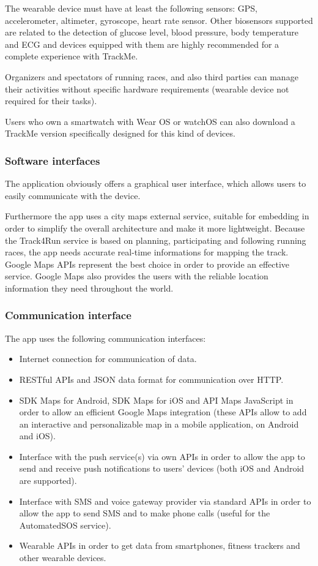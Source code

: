 The wearable device must have at least the following sensors: GPS, accelerometer, altimeter, gyroscope, heart rate sensor. Other biosensors supported are related to the detection of glucose level, blood pressure, body temperature and ECG and devices equipped with them are highly recommended for a complete experience with TrackMe.

Organizers and spectators of running races, and also third parties can manage their activities without specific hardware requirements (wearable device not required for their tasks).

Users who own a smartwatch with Wear OS or watchOS can also download a TrackMe version specifically designed for this kind of devices.

\subsubsection{Software interfaces}
The application obviously offers a graphical user interface, which allows users to easily communicate with the device.

Furthermore the app uses a city maps external service, suitable for embedding in order to simplify the overall architecture and make it more lightweight. Because the Track4Run service is based on planning, participating and following running races, the app needs accurate real-time informations for mapping the track. Google Maps APIs represent the best choice in order to provide an effective service. Google Maps also provides the users with the reliable location information they need throughout the world.

\subsubsection{Communication interface}
The app uses the following communication interfaces:
\begin{itemize}
\item Internet connection for communication of data.
\item RESTful APIs and JSON data format for communication over HTTP.
\item SDK Maps for Android, SDK Maps for iOS and API Maps JavaScript in order to allow an efficient Google Maps integration (these APIs allow to add an interactive and personalizable map in a mobile application, on Android and iOS).
\item Interface with the push service(s) via own APIs in order to allow the app to send and receive push notifications to users' devices (both iOS and Android are supported).
\item Interface with SMS and voice gateway provider via standard APIs in order to allow the app to send SMS and to make phone calls (useful for the AutomatedSOS service).
\item Wearable APIs in order to get data from smartphones, fitness trackers and other wearable devices.
\end{itemize}


